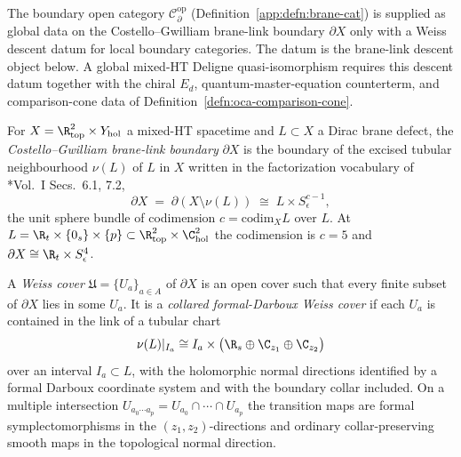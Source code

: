 The boundary open category $\mathcal{C}^{\mathrm{op}}_\partial$
(Definition~\ref{app:defn:brane-cat}) is supplied as global data on the
Costello--Gwilliam brane-link boundary $\partial X$ only with a Weiss
descent datum for local boundary categories.  The datum is the
brane-link descent object below.  A
global mixed-HT Deligne quasi-isomorphism requires this descent datum
together with the chiral \(E_d\), quantum-master-equation counterterm, and
comparison-cone data of Definition~\ref{defn:oca-comparison-cone}.

\begin{defn}\label{app:defn:brane-link}
For $X=\R^2_{\mathrm{top}}\times Y_{\mathrm{hol}}$ a mixed-HT
spacetime and $L\subset X$ a Dirac brane defect, the
\emph{Costello--Gwilliam brane-link boundary} $\partial X$ is the
boundary of the excised tubular neighbourhood $\nu(L)$ of $L$ in $X$
written in the factorization vocabulary of
\cite{costello-gwilliam}*{Vol.~I Secs.~6.1, 7.2},
\[
  \partial X
   \;=\;\partial(X\setminus\nu(L))
   \;\cong\;
   L\times S^{c-1}_\epsilon,
\]
the unit sphere bundle of codimension $c=\mathrm{codim}_X L$ over $L$.
At $L=\R_t\times\{0_s\}\times\{p\}
\subset\R^2_{\mathrm{top}}\times\C^2_{\mathrm{hol}}$
the codimension is $c=5$ and
$\partial X\cong\R_t\times S^4_\epsilon$.
\end{defn}

\begin{defn}\label{app:defn:collared-darboux-weiss-cover}
A \emph{Weiss cover} \(\mathfrak U=\{U_a\}_{a\in A}\) of
\(\partial X\) is an open cover such that every finite subset of
\(\partial X\) lies in some \(U_a\).  It is a
\emph{collared formal-Darboux Weiss cover} if each \(U_a\) is contained
in the link of a tubular chart
\[
  \nu(L)|_{I_a}\cong I_a\times
  \bigl(\R_s\oplus\C_{z_1}\oplus\C_{z_2}\bigr)
\]
over an interval \(I_a\subset L\), with the holomorphic normal directions
identified by a formal Darboux coordinate system and with the boundary
collar included.  On a multiple intersection
\(U_{a_0\cdots a_p}=U_{a_0}\cap\cdots\cap U_{a_p}\) the transition maps
are formal symplectomorphisms in the \((z_1,z_2)\)-directions and
ordinary collar-preserving smooth maps in the topological normal
direction.
\end{defn}

